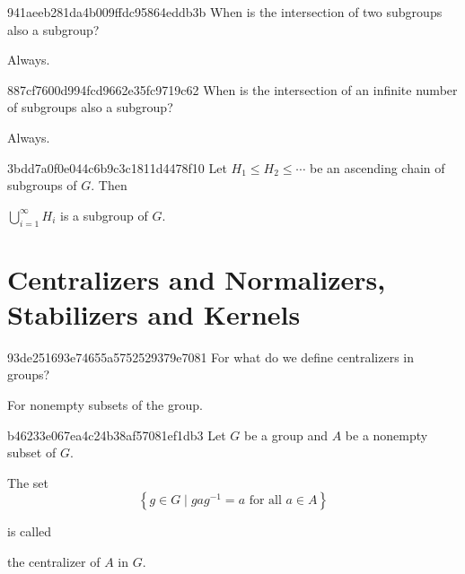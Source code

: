 \begin{note}{941aeeb281da4b009ffdc95864eddb3b}
    When is the intersection of two subgroups also a subgroup?

    \begin{cloze}{1}
        Always.
    \end{cloze}
\end{note}

\begin{note}{887cf7600d994fcd9662e35fc9719c62}
    When is the intersection of an infinite number of subgroups also a subgroup?

    \begin{cloze}{1}
        Always.
    \end{cloze}
\end{note}

\begin{note}{3bdd7a0f0e044c6b9c3c1811d4478f10}
    Let \({ H_1 \leq H_2 \leq \cdots }\) be an ascending chain of subgroups of \({ G }\).
    Then \begin{icloze}{1}\({ \bigcup_{i=1}^{\infty} H_i }\) is a subgroup of \({ G }\).\end{icloze}
\end{note}

\section{Centralizers and Normalizers, Stabilizers and Kernels}
\begin{note}{93de251693e74655a5752529379e7081}
    For what do we define centralizers in groups?

    \begin{cloze}{1}
        For nonempty subsets of the group.
    \end{cloze}
\end{note}

\begin{note}{b46233e067ea4c24b38af57081ef1db3}
    Let \({ G }\) be a group and \({ A }\) be a nonempty subset of \({ G }\).
    \begin{icloze}{1}
        The set
        \[
            \left\{ g \in G \mid gag^{-1} = a \text{ for all } a \in A \right\}
        \]
    \end{icloze}
    is called \begin{icloze}{2}the centralizer of \({ A }\) in \({ G }\).\end{icloze}
\end{note}

